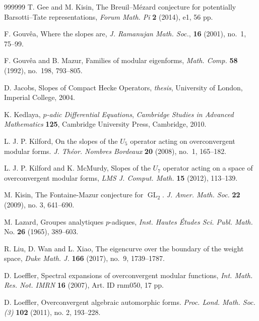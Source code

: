 \documentclass[12pt]{amsart}
\theoremstyle{definition}
\numberwithin{equation}{subsection}
\DeclareMathOperator{\GL}{GL}
\begin{document}
\begin{thebibliography}{999999}
T. Gee and M. Kisin,
The Breuil--M\'ezard conjecture for potentially Barsotti--Tate representations,	{\it Forum Math. Pi} {\bf 2} (2014), e1, 56 pp.

F. Gouv\^ea, Where the slopes are, {\it J. Ramanujan Math. Soc.}, {\bf 16} (2001), no.~1, 75--99.


F. Gouv\^ea and
B. Mazur,  Families of modular eigenforms, {\it  Math. Comp.} {\bf 58} (1992), no.~198, 793--805.



D. Jacobs, Slopes of Compact Hecke Operators, {\it thesis}, University of London, Imperial College, 2004.

K. Kedlaya, {\it $p$-adic Differential Equations}, {\it Cambridge Studies in Advanced Mathematics} {\bf 125}, Cambridge University Press, Cambridge, 2010.

L. J. P. Kilford, On the slopes of the $U_5$ operator acting on overconvergent modular forms. {\it J. Th\'eor. Nombres Bordeaux} {\bf 20} (2008), no.~1, 165--182.

L. J. P. Kilford and K. McMurdy, Slopes of the $U_7$ operator acting on a space of overconvergent modular forms, {\it LMS J. Comput. Math.} {\bf 15} (2012), 113--139.

M. Kisin,
The Fontaine-Mazur conjecture for $\GL_2$. {\it J. Amer. Math. Soc.} {\bf 22} (2009), no. 3, 641--690.

M. Lazard, Groupes analytiques $p$-adiques, {\it Inst. Hautes \'Etudes Sci. Publ. Math.} No. {\bf 26} (1965), 389--603.


R. Liu, D. Wan and L. Xiao, The eigencurve over the boundary of the
weight space, {\it Duke Math. J.} {\bf 166} (2017), no.~9, 1739--1787.

D. Loeffler, Spectral expansions of overconvergent modular functions, {\it Int. Math. Res. Not. IMRN} {\bf 16} (2007), Art. ID rnm050, 17 pp.

D. Loeffler, Overconvergent algebraic automorphic forms. {\it Proc. Lond. Math. Soc. (3)} {\bf 102} (2011), no. 2, 193--228.


\end{thebibliography}
\end{document}
